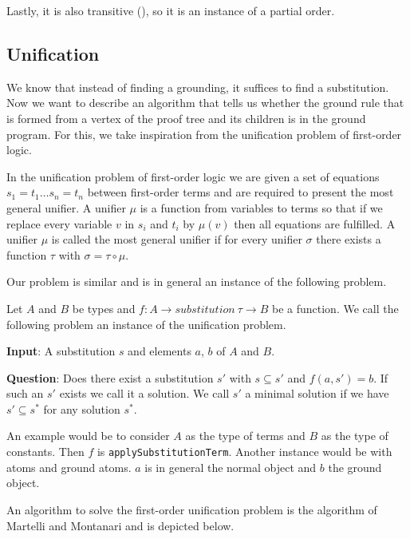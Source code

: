     Lastly, it is also transitive (\substitutionsubstrans), so it is an instance of a partial order.

\subsection{Unification}

We know that instead of finding a grounding, it suffices to find a substitution. Now we want to describe an algorithm that tells us whether the ground rule that is formed from a vertex of the proof tree and its children is in the ground program. For this, we take inspiration from the unification problem of first-order logic.

In the unification problem of first-order logic we are given a set of equations $s_1 = t_1 \dots s_n = t_n$ between first-order terms and are required to present the most general unifier. A unifier $\mu$ is a function from variables to terms so that if we replace every variable $v$ in $s_i$ and $t_i$ by $\mu (v)$ then all equations are fulfilled. A unifier $\mu$ is called the most general unifier if for every unifier $\sigma$ there exists a function $\tau$ with $\sigma = \tau \circ \mu$.

Our problem is similar and is in general an instance of the following problem.

\begin{definition}
    Let $A$ and $B$ be types and $f: A \to substitution\ \tau \to B$ be a function. We call the following problem an instance of the unification problem.

    \textbf{Input}: A substitution $s$ and elements $a$, $b$ of $A$ and $B$.

    \textbf{Question}: Does there exist a substitution $s'$ with $s \subseteq s'$ and $f(a, s') = b$. If such an $s'$ exists we call it a solution. We call $s'$ a minimal solution if we have $s' \subseteq s^\ast$ for any solution $s^\ast$.
\end{definition}

An example would be to consider $A$ as the type of terms and $B$ as the type of constants. Then $f$ is \lstinline|applySubstitutionTerm|. Another instance would be with atoms and ground atoms. $a$ is in general the normal object and $b$ the ground object.

An algorithm to solve the first-order unification problem is the algorithm of Martelli and Montanari \cite{MartMont} and is depicted below.


